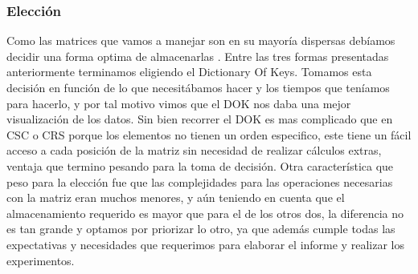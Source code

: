 \subsubsection{Elección}
Como las matrices que vamos a manejar son en su mayoría dispersas debíamos decidir una forma optima de almacenarlas .
Entre las tres formas presentadas anteriormente terminamos eligiendo el Dictionary Of Keys. Tomamos esta decisión en función de lo que necesitábamos hacer y los tiempos que teníamos para hacerlo, y por tal motivo vimos que el DOK nos daba una mejor visualización de los datos. Sin bien recorrer el DOK es mas complicado que en CSC o CRS porque los elementos no tienen un orden especifico, este tiene un fácil acceso a cada posición de la matriz sin necesidad de realizar cálculos extras, ventaja que termino pesando para la toma de decisión.  Otra característica que peso para la elección fue que las complejidades para las operaciones necesarias con la matriz eran muchos menores, y aún teniendo en cuenta que el almacenamiento requerido es mayor que para el de los otros dos, la diferencia no es tan grande y optamos por priorizar lo otro, ya que además cumple todas las expectativas y necesidades que requerimos para elaborar el informe y realizar los experimentos.




